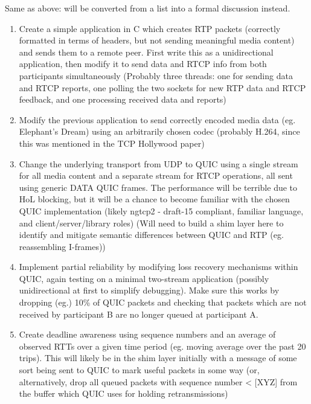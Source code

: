 \documentclass{mprop}
\begin{document}
Same as above: will be converted from a list into a formal discussion instead.

\begin{enumerate}
  \item Create a simple application in C which creates RTP packets (correctly formatted in terms 
  of headers, but not sending meaningful media content) and sends them to a remote peer. First 
  write this as a unidirectional application, then modify it to send data and RTCP info from both 
  participants simultaneously (Probably three threads: one for sending data and RTCP reports, one 
  polling the two sockets for new RTP data and RTCP feedback, and one processing received data 
  and reports)

  \item Modify the previous application to send correctly encoded media data (eg. Elephant's 
  Dream) using an arbitrarily chosen codec (probably H.264, since this was mentioned in the TCP 
  Hollywood paper)

  \item Change the underlying transport from UDP to QUIC using a single stream for all media 
  content and a separate stream for RTCP operations, all sent using generic DATA QUIC frames. The 
  performance will be terrible due to HoL blocking, but it will be a chance to become familiar 
  with the chosen QUIC implementation (likely ngtcp2 - draft-15 compliant, familiar language, and 
  client/server/library roles) (Will need to build a shim layer here to identify and mitigate 
  semantic differences between QUIC and RTP (eg. reassembling I-frames))

  \item Implement partial reliability by modifying loss recovery mechanisms within QUIC, again 
  testing on a minimal two-stream application (possibly unidirectional at first to simplify 
  debugging). Make sure this works by dropping (eg.) 10\% of QUIC packets and checking that 
  packets which are not received by participant B are no longer queued at participant A.

  \item Create deadline awareness using sequence numbers and an average of observed RTTs over a 
  given time period (eg. moving average over the past 20 trips). This will likely be in the shim 
  layer initially with a message of some sort being sent to QUIC to mark useful packets in some 
  way (or, alternatively, drop all queued packets with sequence number < [XYZ] from the buffer 
  which QUIC uses for holding retransmissions)


\end{enumerate}
\end{document}
